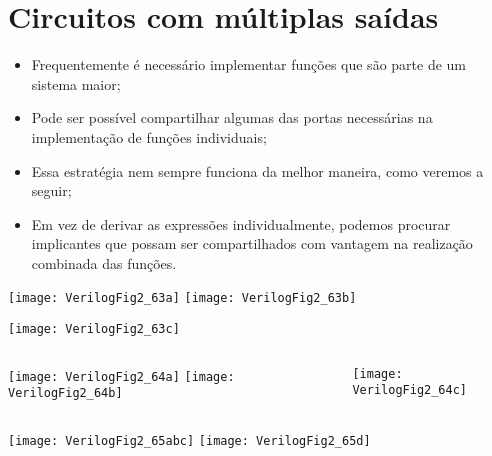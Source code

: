 \section{Circuitos com múltiplas saídas}

\begin{frame}{\insertsection} %
	\begin{itemize}
		\item Frequentemente é necessário implementar funções que são parte de um sistema maior;
		\item Pode ser possível compartilhar algumas das portas necessárias na implementação de funções individuais;
		\item Essa estratégia nem sempre funciona da melhor maneira, como veremos a seguir;
        \item Em vez de derivar as expressões individualmente, podemos procurar implicantes que possam ser compartilhados com vantagem na realização combinada das funções.
    \end{itemize}
\end{frame}

\begin{frame}{\insertsection} \centering
    \texttt{[image: VerilogFig2\_63a]}
    \hspace{1cm}
    \texttt{[image: VerilogFig2\_63b]} 
\end{frame}

\begin{frame}{\insertsection} \centering
    \texttt{[image: VerilogFig2\_63c]}
\end{frame}

\begin{frame}{\insertsection} 
    \begin{columns}
        \begin{column}{0.50\textwidth}
            \centering
            \texttt{[image: VerilogFig2\_64a]}
            \texttt{[image: VerilogFig2\_64b]}
        \end{column}        
        \begin{column}{0.50\textwidth}
            \texttt{[image: VerilogFig2\_64c]}
        \end{column}
    \end{columns}    
\end{frame}

\begin{frame}{\insertsection} \centering
    \texttt{[image: VerilogFig2\_65abc]}
    \texttt{[image: VerilogFig2\_65d]}
\end{frame}

